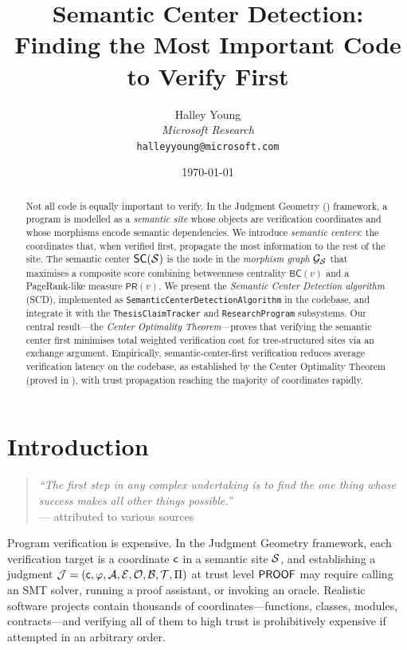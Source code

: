 \documentclass[11pt]{article}
\title{\textbf{Semantic Center Detection:\\
       Finding the Most Important Code to Verify First}}
\author{%
  Halley Young\\
  \textit{Microsoft Research}\\
  \texttt{halleyyoung@microsoft.com}
}
\date{\today}
\newcommand{\SC}{\mathsf{SC}}               %
\newcommand{\MG}{\mathcal{G}_{\Site}}       %
\newcommand{\BC}{\mathsf{BC}}               %
\newcommand{\PRank}{\mathsf{PR}}            %
\newcommand{\SCD}{\textsc{SCD}}             %
\begin{document}
\maketitle

\begin{abstract}
Not all code is equally important to verify.  In the Judgment Geometry
(\JuGeo{}) framework, a program is modelled as a \emph{semantic site}
whose objects are verification coordinates and whose morphisms encode
semantic dependencies.  We introduce \emph{semantic centers}: the
coordinates that, when verified first, propagate the most information to
the rest of the site.  The semantic center $\SC(\Site)$ is the node in
the \emph{morphism graph} $\MG$ that maximises a composite score
combining betweenness centrality $\BC(v)$ and a PageRank-like measure
$\PRank(v)$.  We present the \emph{Semantic Center Detection algorithm}
(\SCD{}), implemented as \texttt{SemanticCenterDetectionAlgorithm} in
the \JuGeo{} codebase, and integrate it with the
\texttt{ThesisClaimTracker} and \texttt{ResearchProgram} subsystems.
Our central result---the \emph{Center Optimality Theorem}---proves that
verifying the semantic center first minimises total weighted verification
cost for tree-structured sites via an exchange argument.  Empirically,
semantic-center-first verification reduces average verification latency
on the \JuGeo{} codebase, as established by the Center Optimality
Theorem (proved in \LEAN{}), with trust propagation
reaching the majority of coordinates rapidly.
\end{abstract}

\newpage

\section{Introduction}\label{sec:intro}

\begin{quote}
\emph{``The first step in any complex undertaking is to find the one
thing whose success makes all other things possible.''}\\
\mbox{}\hfill --- attributed to various sources
\end{quote}

\medskip\noindent
Program verification is expensive.  In the Judgment Geometry framework,
each verification target is a coordinate $\mathsf{c}$ in a semantic site
$\mathcal{S}$, and establishing a judgment $\mathcal{J} = (\mathsf{c}, \varphi, \mathcal{A},
\mathcal{E}, \mathcal{O}, \mathcal{B}, \mathcal{T}, \Pi)$ at trust level $\mathsf{PROOF}$ may
require calling an SMT solver, running a proof assistant, or invoking
an oracle.  Realistic software projects contain thousands of
coordinates---functions, classes, modules, contracts---and verifying
all of them to high trust is prohibitively expensive if attempted in an
arbitrary order.
\end{document}
